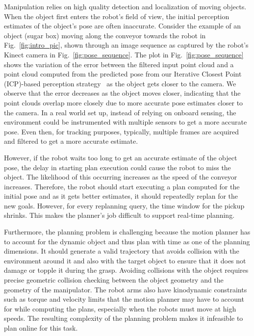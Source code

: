 \documentclass[a4paper]{report}
\begin{document}
Manipulation relies on high quality detection and localization of moving objects. When the object first enters the robot's field of view, the initial perception estimates of the object's pose are often inaccurate. Consider the example of an object (sugar box) moving along the conveyor towards the robot in Fig.~\ref{fig:intro_pic}, shown through an image sequence as captured by the robot's Kinect camera in Fig.~\ref{fig:pose_sequence}. 
%
The plot in Fig.~\ref{fig:pose_sequence} shows the variation of the error between the filtered input point cloud and a point cloud computed from the predicted pose from our Iterative Closest Point (ICP)-based perception strategy~\cite{ISL19} as the object gets closer to the camera. We observe that the error decreases as the object moves closer, indicating that the point clouds overlap more closely due to more accurate pose estimates closer to the camera.
In a real world set up, instead of relying on onboard sensing, the environment could be instrumented with multiple sensors to get a more accurate pose. Even then, for tracking purposes, typically, multiple frames are acquired and filtered to get a more accurate estimate.

However, if the robot waits too long to get an accurate estimate of the object pose, the delay in starting plan execution could cause the robot to miss the object. The likelihood of this occurring increases as the speed of the conveyor increases. Therefore, the robot should start executing a plan computed for the initial pose and as it gets better estimates, it should repeatedly replan for the new goals. However, for every replanning query, the time window for the pickup shrinks. This makes the planner's job difficult to support real-time planning.


Furthermore, the planning problem is challenging because the motion planner has to account for the dynamic object and thus plan with time as one of the planning dimensions. It should generate a valid trajectory that avoids collision with the environment around it and also with the target object to ensure that it does not damage or topple it during the grasp. Avoiding collisions with the object requires precise geometric collision checking between the object geometry and the geometry of the manipulator.
The robot arms also have kinodynamic constraints such as torque and velocity limits that the motion planner may have to account for while computing the plans, especially when the robots must move at high speeds.
The resulting complexity of the planning problem makes it infeasible to plan online for this task.
\end{document}
